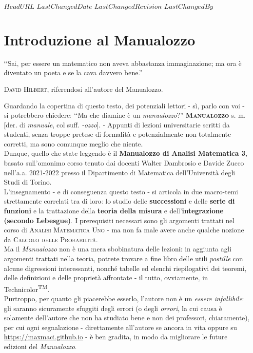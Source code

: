 \svnidlong
{$HeadURL$}
{$LastChangedDate$}
{$LastChangedRevision$}
{$LastChangedBy$}

\chapter*{Introduzione al Manualozzo}

\begin{introduction}
‘‘Sai, per essere un matematico non aveva abbastanza immaginazione; ma ora è diventato un poeta e se la cava davvero bene.''
\begin{flushright}
	\textsc{David Hilbert,} riferendosi  all'autore del Manualozzo.
\end{flushright}
\end{introduction}

\noindent Guardando la copertina di questo testo, dei potenziali lettori - sì, parlo con voi - si potrebbero chiedere: ‘‘Ma che diamine è un \textit{manualozzo}?''
\vspace{3mm}
\lettrine[findent=1pt, nindent=0pt]{\textbf{M}}{\textbf{anualozzo}} s. m. [der. di \textit{manuale}, col suff. \textit{-ozzo}]. - Appunti di lezioni universitarie scritti da studenti, senza troppe pretese di formalità e potenzialmente non totalmente corretti, ma sono comunque meglio che niente.
\vspace{3mm}\\
Dunque, quello che state leggendo è il \textbf{Manualozzo di Analisi Matematica 3}, basato sull'omonimo corso tenuto dai docenti Walter Dambrosio e Davide Zucco nell'a.a. 2021-2022 presso il Dipartimento di Matematica dell'Università degli Studi di Torino.\\
L'insegnamento - e di conseguenza questo testo - si articola in due macro-temi strettamente correlati tra di loro: lo studio delle \textbf{successioni} e delle \textbf{serie di funzioni} e la trattazione della \textbf{teoria della misura} e dell'\textbf{integrazione (secondo Lebesgue)}. I prerequisiti necessari sono gli argomenti trattati nel corso di \textsc{Analisi Matematica Uno} - ma non fa male avere anche qualche nozione da \textsc{Calcolo delle Probabilità}.\\
Ma il \textit{Manualozzo} non è una mera sbobinatura delle lezioni: in aggiunta agli argomenti trattati nella teoria, potrete trovare a fine libro delle utili \textit{postille} con alcune digressioni interessanti, nonché tabelle ed elenchi riepilogativi dei teoremi, delle definizioni e delle proprietà affrontate - il tutto, ovviamente, in Technicolor\textsuperscript{TM}.\\
Purtroppo, per quanto gli piacerebbe esserlo, l'autore non è un \textit{essere infallibile}: gli saranno sicuramente sfuggiti degli errori (o degli \textit{orrori}, la cui causa è solamente dell'autore che non ha studiato bene e non dei professori, chiaramente), per cui ogni segnalazione - direttamente all'autore se ancora in vita oppure su \textcolor{redill}{\url{https://maxmaci.github.io}} - è ben gradita, in modo da migliorare le future edizioni del \textit{Manualozzo}.\\

